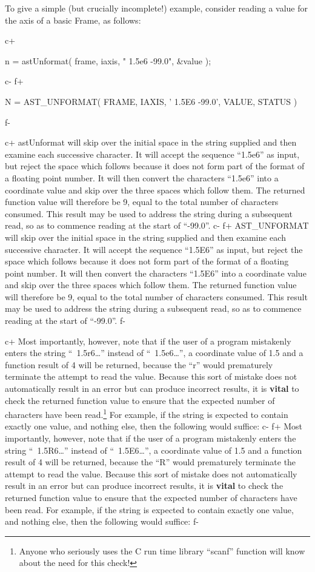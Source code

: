 \documentclass[twoside,11pt]{starlink}
\begin{document}
To give a simple (but crucially incomplete!) example, consider reading
a value for the axis of a basic Frame, as follows:

c+
\small
\begin{terminalv}
n = astUnformat( frame, iaxis, " 1.5e6   -99.0", &value );
\end{terminalv}
\normalsize
c-
f+
\small
\begin{terminalv}
      N = AST_UNFORMAT( FRAME, IAXIS, ' 1.5E6   -99.0', VALUE, STATUS )
\end{terminalv}
\normalsize
f-

c+
astUnformat will skip over the initial space in the string supplied
and then examine each successive character. It will accept the
sequence ``1.5e6'' as input, but reject the space which follows
because it does not form part of the format of a floating point
number. It will then convert the characters ``1.5e6'' into a
coordinate value and skip over the three spaces which follow them. The
returned function value will therefore be 9, equal to the total number
of characters consumed. This result may be used to address the string
during a subsequent read, so as to commence reading at the start of
``-99.0''.
c-
f+
AST\_UNFORMAT will skip over the initial space in the string supplied
and then examine each successive character. It will accept the
sequence ``1.5E6'' as input, but reject the space which follows
because it does not form part of the format of a floating point
number. It will then convert the characters ``1.5E6'' into a
coordinate value and skip over the three spaces which follow them. The
returned function value will therefore be 9, equal to the total number
of characters consumed. This result may be used to address the string
during a subsequent read, so as to commence reading at the start of
``-99.0''.
f-

c+
Most importantly, however, note that if the user of a program
mistakenly enters the string ``~1.5r6\ldots'' instead of
``~1.5e6\ldots'', a coordinate value of 1.5 and a function result of 4
will be returned, because the ``r'' would prematurely terminate the
attempt to read the value. Because this sort of mistake does not
automatically result in an error but can produce incorrect results, it
is \textbf{vital} to check the returned function value to ensure that
the expected number of characters have been read.\footnote{Anyone who
seriously uses the C run time library ``scanf'' function will know
about the need for this check!}  For example, if the string is
expected to contain exactly one value, and nothing else, then the
following would suffice:
c-
f+
Most importantly, however, note that if the user of a program
mistakenly enters the string ``~1.5R6\ldots'' instead of
``~1.5E6\ldots'', a coordinate value of 1.5 and a function result of 4
will be returned, because the ``R'' would prematurely terminate the
attempt to read the value. Because this sort of mistake does not
automatically result in an error but can produce incorrect results, it
is \textbf{vital} to check the returned function value to ensure that
the expected number of characters have been read. For example, if the
string is expected to contain exactly one value, and nothing else,
then the following would suffice:
f-
\end{document}

